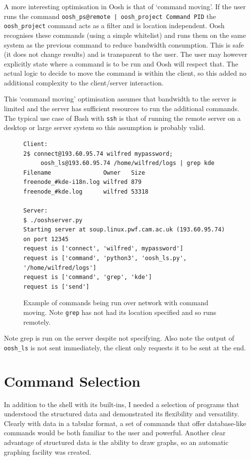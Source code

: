 \documentclass[12pt,twoside,notitlepage]{report}
\begin{document}
A more interesting optimisation in Oosh is that of `command moving'. If
the user runs the command {\tt oosh\_ps@remote | oosh\_project Command
  PID} the {\tt oosh\_project} command acts as a filter and is
location independent. Oosh recognises these commands (using a simple
whitelist) and runs them on the same system as the previous command to
reduce bandwidth consumption. This is safe (it does not change
results) and is transparent to the user. The user may however
explicitly state where a command is to be run and Oosh will respect
that. The actual logic to decide to move the command is
within the client, so this added no additional complexity to the
client/server interaction. 

This `command moving' optimisation assumes that bandwidth to the
server is limited and the server has sufficient resources to run the
additional commands. The typical use case of Bash with {\tt ssh} is
that of running the remote server on a desktop or large server system
so this assumption is probably valid.

\begin{figure}
\caption{Example of commands being run over network with command
  moving. Note {\tt grep} has not had its location specified and so
  runs remotely.}
\begin{verbatim}
Client:
2$ connect@193.60.95.74 wilfred mypassword;
     oosh_ls@193.60.95.74 /home/wilfred/logs | grep kde
Filename               Owner   Size
freenode_#kde-i18n.log wilfred 879
freenode_#kde.log      wilfred 53318

Server:
$ ./ooshserver.py
Starting server at soup.linux.pwf.cam.ac.uk (193.60.95.74) on port 12345
request is ['connect', 'wilfred', mypassword']
request is ['command', 'python3', 'oosh_ls.py', '/home/wilfred/logs']
request is ['command', 'grep', 'kde']
request is ['send']
\end{verbatim}
\end{figure}

Note grep is run on the server despite not specifying. Also note the
output of {\tt oosh\_ls} is not sent immediately, the client only
requests it to be sent at the end.


\section{Command Selection}
In addition to the shell with its built-ins, I needed a selection of programs
that understood the structured data and demonstrated its flexibility and
versatility. Clearly with data in a tabular format, a set of commands that offer
database-like commands would be both familiar to the user and powerful. Another
clear advantage of structured data is the ability to draw graphs, so an
automatic graphing facility was created.
\end{document}
